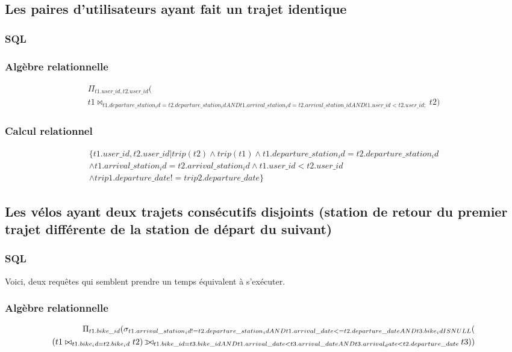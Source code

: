 \documentclass[a4paper,10pt]{article}
\def\ojoin{\setbox0=\hbox{$\bowtie$}%
  \rule[-.02ex]{.25em}{.4pt}\llap{\rule[\ht0]{.25em}{.4pt}}}
\def\leftouterjoin{\mathbin{\ojoin\mkern-5.8mu\bowtie}}
\begin{document}
\pagebreak
\subsection{Les paires d'utilisateurs ayant fait un trajet identique}
\subsubsection{SQL}

\subsubsection{Algèbre relationnelle}
\begin{align}
\Pi_{t1.user\_id, t2.user\_id}( \\t1 \bowtie_{t1.departure\_station_id = t2.departure\_station_id
AND t1.arrival\_station_id = t2.arrival\_station\_id AND t1.user\_id < t2.user\_id;
} t2)
\end{align}
\subsubsection{Calcul relationnel}
\begin{align}
	\{ t1.user\_id, t2.user\_id | trip(t2) \wedge trip(t1) \wedge t1.departure\_station_id = t2.departure\_station_id \\ \wedge t1.arrival\_station_id = t2.arrival\_station_id \wedge t1.user\_id < t2.user\_id \\ \wedge trip1.departure\_date != trip2.departure\_date \}
\end{align}


\pagebreak
\subsection{Les vélos ayant deux trajets consécutifs disjoints (station de retour du premier trajet différente de la station de départ du suivant)}
\subsubsection{SQL}
Voici, deux requêtes qui semblent prendre un temps équivalent à s'exécuter.


\subsubsection{Algèbre relationnelle}
\begin{align}
\Pi_{t1.bike\_id}(\sigma_{t1.arrival\_station_id != t2.departure\_station_id
       AND t1.arrival\_date <= t2.departure\_date
       AND t3.bike_id IS NULL}( \\ (t1 \bowtie_{t1.bike_id = t2.bike_id} t2)\leftouterjoin_{t1.bike\_id = t3.bike\_id AND t1.arrival\_date < t3.arrival\_date AND t3.arrival_date < t2.departure\_date} t3))
\end{align}
\end{document}
